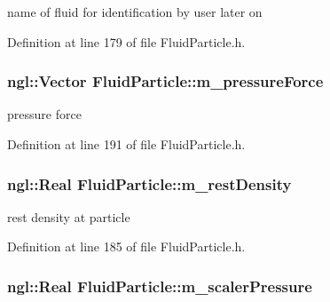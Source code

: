 name of fluid for identification by user later on 



Definition at line 179 of file FluidParticle.h.

\hypertarget{class_fluid_particle_a0fc3f13aa67912329489ec7f3550af13}{
\subsubsection[{m\_\-pressureForce}]{\setlength{\rightskip}{0pt plus 5cm}ngl::Vector {\bf FluidParticle::m\_\-pressureForce}}}
\label{class_fluid_particle_a0fc3f13aa67912329489ec7f3550af13}


pressure force 



Definition at line 191 of file FluidParticle.h.

\hypertarget{class_fluid_particle_aa8e7cedce80b89676c3c4ddba1e163f3}{
\subsubsection[{m\_\-restDensity}]{\setlength{\rightskip}{0pt plus 5cm}ngl::Real {\bf FluidParticle::m\_\-restDensity}}}
\label{class_fluid_particle_aa8e7cedce80b89676c3c4ddba1e163f3}


rest density at particle 



Definition at line 185 of file FluidParticle.h.

\hypertarget{class_fluid_particle_a3b5d86db4ec613904adcac9e55c15e38}{
\subsubsection[{m\_\-scalerPressure}]{\setlength{\rightskip}{0pt plus 5cm}ngl::Real {\bf FluidParticle::m\_\-scalerPressure}}}
\label{class_fluid_particle_a3b5d86db4ec613904adcac9e55c15e38}


